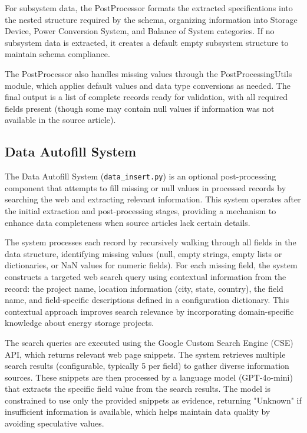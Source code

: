 \documentclass[11pt]{article}
\begin{document}
For subsystem data, the PostProcessor formats the extracted specifications into the nested structure required by the schema, organizing information into Storage Device, Power Conversion System, and Balance of System categories. If no subsystem data is extracted, it creates a default empty subsystem structure to maintain schema compliance.

The PostProcessor also handles missing values through the PostProcessingUtils module, which applies default values and data type conversions as needed. The final output is a list of complete records ready for validation, with all required fields present (though some may contain null values if information was not available in the source article).

\subsection{Data Autofill System}

The Data Autofill System (\texttt{data\_insert.py}) is an optional post-processing component that attempts to fill missing or null values in processed records by searching the web and extracting relevant information. This system operates after the initial extraction and post-processing stages, providing a mechanism to enhance data completeness when source articles lack certain details.

The system processes each record by recursively walking through all fields in the data structure, identifying missing values (null, empty strings, empty lists or dictionaries, or NaN values for numeric fields). For each missing field, the system constructs a targeted web search query using contextual information from the record: the project name, location information (city, state, country), the field name, and field-specific descriptions defined in a configuration dictionary. This contextual approach improves search relevance by incorporating domain-specific knowledge about energy storage projects.

The search queries are executed using the Google Custom Search Engine (CSE) API, which returns relevant web page snippets. The system retrieves multiple search results (configurable, typically 5 per field) to gather diverse information sources. These snippets are then processed by a language model (GPT-4o-mini) that extracts the specific field value from the search results. The model is constrained to use only the provided snippets as evidence, returning "Unknown" if insufficient information is available, which helps maintain data quality by avoiding speculative values.
\end{document}
